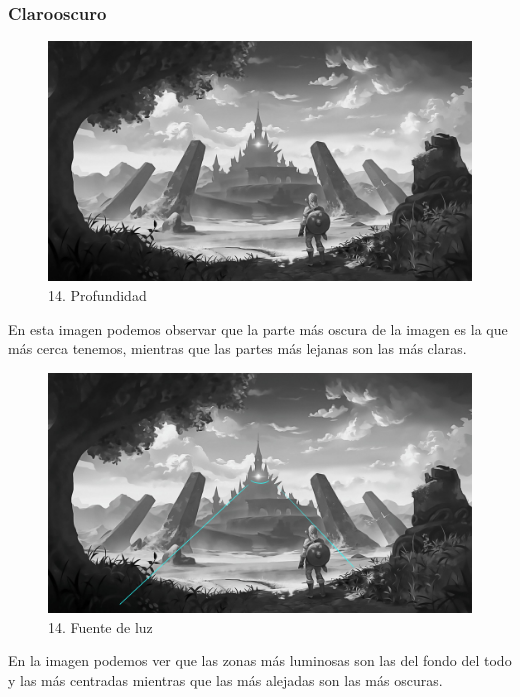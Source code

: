 \documentclass[12pt]{article}
\begin{document}
    \subsubsection{Clarooscuro}
    \begin{figure}[H]
      \centering
      \includegraphics[scale=0.35]{images/Selena/14_concept_art gris.jpg}
      \caption{\small 14. Profundidad}
    \end{figure}
    En esta imagen podemos observar que la parte más oscura de la imagen es la que más cerca tenemos, mientras que las partes más lejanas son las más claras.

    \begin{figure}[H]
      \centering
      \includegraphics[scale=0.35]{images/Selena/14_concept_arta.jpg}
      \caption{\small 14. Fuente de luz}
    \end{figure}
    En la imagen podemos ver que las zonas más luminosas son las del fondo del todo y las más centradas mientras que las más alejadas son las más oscuras.
\end{document}
